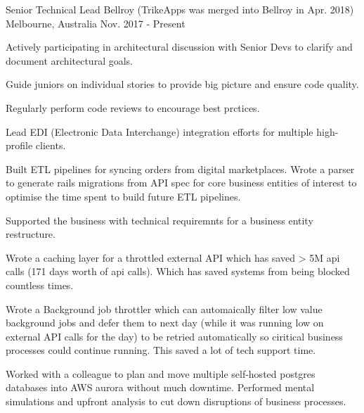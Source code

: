 

\begin{cventries}

  \cventry
    {Senior Technical Lead} %
    {Bellroy (TrikeApps was merged into Bellroy in Apr. 2018)} %
    {Melbourne, Australia} %
    {Nov. 2017 - Present} %
    {
      \begin{cvitems} %
        \item {Actively participating in architectural discussion with Senior Devs to clarify and document architectural goals.}
        \item {Guide juniors on individual stories to provide big picture and ensure code quality.}
        \item {Regularly perform code reviews to encourage best prctices.}
        \item {Lead EDI (Electronic Data Interchange) integration efforts for multiple high-profile clients.}
        \item {Built ETL pipelines for syncing orders from digital marketplaces. Wrote a parser to generate rails migrations from API spec for core business entities of interest to optimise the time spent to build future ETL pipelines.}
        \item {Supported the business with technical requiremnts for a business entity restructure.}
        \item {Wrote a caching layer for a throttled external API which has saved > 5M api calls (171 days worth of api calls). Which has saved systems from being blocked countless times.}
        \item {Wrote a Background job throttler which can automaically filter low value background jobs and defer them to next day (while it was running low on external API calls for the day) to be retried automatically so ciritical business processes could continue running. This saved a lot of tech support time.}
        \item {Worked with a colleague to plan and move multiple self-hosted postgres databases into AWS aurora without much downtime. Performed mental simulations and upfront analysis to cut down disruptions of business processes.}

\end{cvitems}}
\end{cventries}
